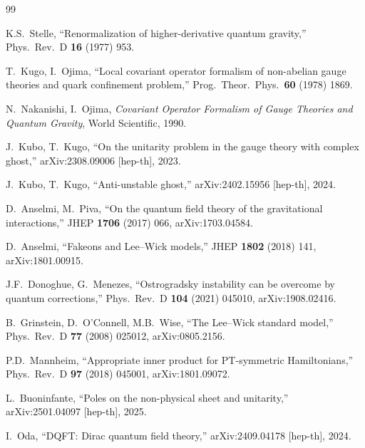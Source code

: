 \documentclass[11pt,a4paper]{article}
\begin{document}
\begin{thebibliography}{99}

  K.S.~Stelle, ``Renormalization of higher-derivative quantum gravity,''
  Phys.\ Rev.\ D \textbf{16} (1977) 953.

  T.~Kugo, I.~Ojima,
  ``Local covariant operator formalism of non-abelian gauge theories
  and quark confinement problem,''
  Prog.\ Theor.\ Phys.\ \textbf{60} (1978) 1869.

  N.~Nakanishi, I.~Ojima,
  \emph{Covariant Operator Formalism of Gauge Theories and Quantum Gravity},
  World Scientific, 1990.

  J.~Kubo, T.~Kugo,
  ``On the unitarity problem in the gauge theory with complex ghost,''
  arXiv:2308.09006 [hep-th], 2023.

  J.~Kubo, T.~Kugo,
  ``Anti-unstable ghost,''
  arXiv:2402.15956 [hep-th], 2024.

  D.~Anselmi, M.~Piva,
  ``On the quantum field theory of the gravitational interactions,''
  JHEP \textbf{1706} (2017) 066, arXiv:1703.04584.

  D.~Anselmi,
  ``Fakeons and Lee--Wick models,''
  JHEP \textbf{1802} (2018) 141, arXiv:1801.00915.

  J.F.~Donoghue, G.~Menezes,
  ``Ostrogradsky instability can be overcome by quantum corrections,''
  Phys.\ Rev.\ D \textbf{104} (2021) 045010, arXiv:1908.02416.

  B.~Grinstein, D.~O'Connell, M.B.~Wise,
  ``The Lee--Wick standard model,''
  Phys.\ Rev.\ D \textbf{77} (2008) 025012, arXiv:0805.2156.

  P.D.~Mannheim,
  ``Appropriate inner product for PT-symmetric Hamiltonians,''
  Phys.\ Rev.\ D \textbf{97} (2018) 045001, arXiv:1801.09072.

  L.~Buoninfante,
  ``Poles on the non-physical sheet and unitarity,''
  arXiv:2501.04097 [hep-th], 2025.

  I.~Oda,
  ``DQFT: Dirac quantum field theory,''
  arXiv:2409.04178 [hep-th], 2024.

\end{thebibliography}
\end{document}
